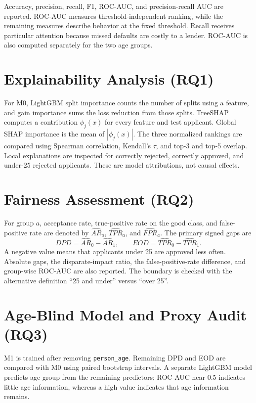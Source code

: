 Accuracy, precision, recall, F1, ROC-AUC, and precision-recall AUC are reported.
ROC-AUC measures threshold-independent ranking, while the remaining measures
describe behavior at the fixed threshold. Recall receives particular attention
because missed defaults are costly to a lender. ROC-AUC is also computed
separately for the two age groups.

\section{Explainability Analysis (RQ1)}

For M0, LightGBM split importance counts the number of splits using a feature,
and gain importance sums the loss reduction from those splits. TreeSHAP
computes a contribution $\phi_j(x)$ for every feature and test applicant.
Global SHAP importance is the mean of $|\phi_j(x)|$. The three normalized
rankings are compared using Spearman correlation, Kendall's $\tau$, and top-3
and top-5 overlap. Local explanations are inspected for correctly rejected,
correctly approved, and under-25 rejected applicants. These are model
attributions, not causal effects.

\section{Fairness Assessment (RQ2)}

For group $a$, acceptance rate, true-positive rate on the good class, and
false-positive rate are denoted by $\widehat{AR}_a$, $\widehat{TPR}_a$, and
$\widehat{FPR}_a$. The primary signed gaps are
\begin{equation}
 DPD = \widehat{AR}_0-\widehat{AR}_1,\qquad
 EOD = \widehat{TPR}_0-\widehat{TPR}_1.
\end{equation}
A negative value means that applicants under 25 are approved less often.
Absolute gaps, the disparate-impact ratio, the false-positive-rate difference,
and group-wise ROC-AUC are also reported. The boundary is checked with the
alternative definition ``25 and under'' versus ``over 25''.

\section{Age-Blind Model and Proxy Audit (RQ3)}

M1 is trained after removing \texttt{person\_age}. Remaining DPD and EOD are
compared with M0 using paired bootstrap intervals. A separate LightGBM model
predicts age group from the remaining predictors; ROC-AUC near 0.5 indicates
little age information, whereas a high value indicates that age information
remains.

